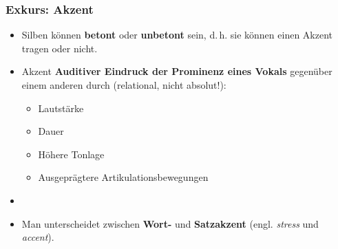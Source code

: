 \begin{frame}
\frametitle{Exkurs: Akzent}

\begin{itemize}
\item Silben können \textbf{betont} oder \textbf{unbetont} sein, d.\,h. sie können einen Akzent tragen oder nicht.
\item[]

\begin{block}{Akzent}
\textbf{Auditiver Eindruck der Prominenz eines Vokals} gegenüber einem anderen durch (relational, nicht absolut!):
\begin{itemize}
\item Lautstärke
\item Dauer
\item Höhere Tonlage
\item Ausgeprägtere Artikulationsbewegungen
\end{itemize}
\end{block}	 

\item[]
\item Man unterscheidet zwischen \textbf{Wort-} und \textbf{Satzakzent} (engl. \emph{stress} und \emph{accent}).

\end{itemize}

\end{frame}




